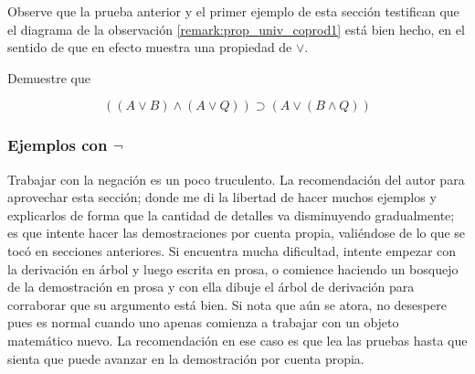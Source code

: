 \documentclass{article}
\begin{document}
\begin{remark}
    Observe que la prueba anterior y el primer ejemplo de esta sección testifican que el diagrama de 
    la observación 
    \ref{remark:prop_univ_coprod1} está bien hecho, en el sentido de que en efecto
    muestra una propiedad de $\lor$.
\end{remark}

\begin{exercise}
    Demuestre que

    $$
        ((A \lor B) \land (A \lor Q)) \supset (A \lor (B \land Q))
    $$
\end{exercise}

\subsubsection{Ejemplos con $\neg$}

Trabajar con la negación es un poco truculento. La recomendación del autor para
aprovechar esta sección; donde me di la libertad de hacer muchos ejemplos y explicarlos
de forma que la cantidad de detalles va disminuyendo gradualmente; es que intente hacer las
demostraciones por cuenta propia, valiéndose de lo que se tocó en secciones anteriores.
Si encuentra mucha dificultad, intente empezar con la derivación en árbol y luego escrita
en prosa, o comience haciendo un bosquejo de la demostración en prosa y con ella
dibuje el árbol de derivación para corraborar que su argumento está bien.
Si nota que aún se atora, no desespere pues es normal cuando uno apenas comienza
a trabajar con un objeto matemático nuevo. La recomendación en ese caso es que
lea las pruebas hasta que sienta que puede avanzar en la demostración por cuenta propia.
\end{document}
